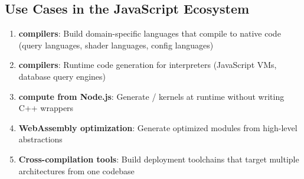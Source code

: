 \subsection{Use Cases in the JavaScript Ecosystem}

\begin{enumerate}[noitemsep]
  \item \textbf{ compilers}: Build domain-specific languages that compile to native code (query languages, shader languages, config languages)
  \item \textbf{ compilers}: Runtime code generation for interpreters (JavaScript VMs, database query engines)
  \item \textbf{ compute from Node.js}: Generate / kernels at runtime without writing C++ wrappers
  \item \textbf{WebAssembly optimization}: Generate optimized  modules from high-level abstractions
  \item \textbf{Cross-compilation tools}: Build deployment toolchains that target multiple architectures from one codebase
\end{enumerate}
